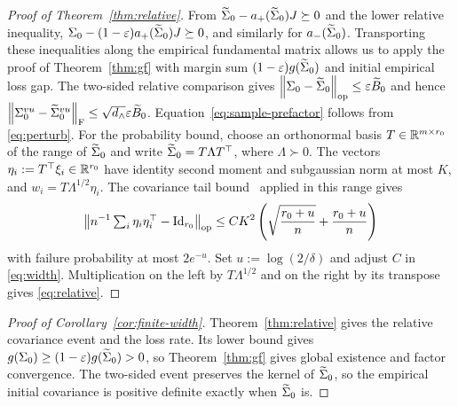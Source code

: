 \begin{proof}[Proof of Theorem~\ref{thm:relative}]
From $\widetilde\Sigma_0-a_+(\widetilde\Sigma_0)J\succeq0$ and the lower relative inequality,
$\Sigma_0-(1-\varepsilon)a_+(\widetilde\Sigma_0)J\succeq0$, and similarly for
$a_-(\widetilde\Sigma_0)$. Transporting these inequalities along the empirical
fundamental matrix allows us to apply the proof of Theorem~\ref{thm:gf} with margin
sum $(1-\varepsilon)g(\widetilde\Sigma_0)$ and initial empirical loss gap. The two-sided relative
comparison gives
$\left\lVert \Sigma_0-\widetilde\Sigma_0 \right\rVert_{\mathrm{op}}\le\varepsilon \widetilde B_0$ and hence
$\left\lVert \Sigma^{vu}_0-\widetilde{\Sigma}^{vu}_0 \right\rVert_{\mathrm{F}}\le\sqrt{d_\wedge}\varepsilon \widetilde B_0$.
Equation~\eqref{eq:sample-prefactor} follows from \eqref{eq:perturb}.
For the probability bound, choose an orthonormal basis
$T\in\mathbb{R}^{m\times r_0}$ of the range of $\widetilde\Sigma_0$ and write
$\widetilde\Sigma_0=T\Lambda T^\top$, where $\Lambda\succ0$.
The vectors $\eta_i:=T^\top\xi_i\in\mathbb{R}^{r_0}$ have identity second
moment and subgaussian norm at most $K$, and
$w_i=T\Lambda^{1/2}\eta_i$.
The covariance tail bound~\citep[Exercise 4.7.3]{Vershynin2018}
applied in this range gives
\[
 \left\lVert n^{-1}\textstyle\sum_i\eta_i\eta_i^\top-\mathrm{Id}_{r_0} \right\rVert_{\mathrm{op}}
 \le CK^2\left(\sqrt{\frac{r_0+u}{n}}+\frac{r_0+u}{n}\right)
\]
with failure probability at most $2e^{-u}$. Set $u:=\log(2/\delta)$ and
adjust $C$ in \eqref{eq:width}. Multiplication on the left by
$T\Lambda^{1/2}$ and on the right by its transpose gives
\eqref{eq:relative}.
\end{proof}
\begin{proof}[Proof of Corollary~\ref{cor:finite-width}]
Theorem~\ref{thm:relative} gives the relative covariance event and the
loss rate. Its lower bound gives
$g(\Sigma_0)\ge(1-\varepsilon)g(\widetilde\Sigma_0)>0$,
so Theorem~\ref{thm:gf} gives global existence and factor convergence.
The two-sided event preserves the kernel of $\widetilde\Sigma_0$, so the empirical
initial covariance is positive definite exactly when $\widetilde\Sigma_0$ is.
\end{proof}

